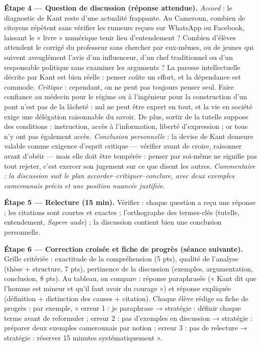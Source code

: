 \documentclass[11pt]{article}
\begin{document}
\begin{exoresolu}
\textbf{Étape 4 — Question de discussion (réponse attendue).} \emph{Accord} : le diagnostic de Kant reste d'une actualité frappante. Au Cameroun, combien de citoyens répètent sans vérifier les rumeurs reçues sur WhatsApp ou Facebook, laissant le « livre » numérique tenir lieu d'entendement ? Combien d'élèves attendent le corrigé du professeur sans chercher par eux-mêmes, ou de jeunes qui suivent aveuglément l'avis d'un influenceur, d'un chef traditionnel ou d'un responsable politique sans examiner les arguments ? La paresse intellectuelle décrite par Kant est bien réelle : penser coûte un effort, et la dépendance est commode. \emph{Critique} : cependant, on ne peut pas toujours penser seul. Faire confiance au médecin pour le régime ou à l'ingénieur pour la construction d'un pont n'est pas de la lâcheté : nul ne peut être expert en tout, et la vie en société exige une délégation raisonnable du savoir. De plus, sortir de la tutelle suppose des conditions : instruction, accès à l'information, liberté d'expression ; or tous n'y ont pas également accès. \emph{Conclusion personnelle} : la devise de Kant demeure valable comme exigence d'esprit critique — vérifier avant de croire, raisonner avant d'obéir — mais elle doit être tempérée : penser par soi-même ne signifie pas tout rejeter, c'est exercer son jugement sur ce que disent les autres. \emph{Commentaire : la discussion suit le plan accorder–critiquer–conclure, avec deux exemples camerounais précis et une position nuancée justifiée.}

\textbf{Étape 5 — Relecture (15 min).} Vérifier : chaque question a reçu une réponse ; les citations sont courtes et exactes ; l'orthographe des termes-clés (tutelle, entendement, \emph{Sapere aude}) ; la discussion contient bien une conclusion personnelle.

\textbf{Étape 6 — Correction croisée et fiche de progrès (séance suivante).} Grille critériée : exactitude de la compréhension (5 pts), qualité de l'analyse (thèse + structure, 7 pts), pertinence de la discussion (exemples, argumentation, conclusion, 8 pts). Au tableau, on compare : réponse paraphrasée (« Kant dit que l'homme est mineur et qu'il faut avoir du courage ») et réponse expliquée (définition + distinction des causes + citation). Chaque élève rédige sa fiche de progrès : par exemple, « erreur 1 : je paraphrase → stratégie : définir chaque terme avant de reformuler ; erreur 2 : pas d'exemples en discussion → stratégie : préparer deux exemples camerounais par notion ; erreur 3 : pas de relecture → stratégie : réserver 15 minutes systématiquement ».
\end{exoresolu}
\end{document}
